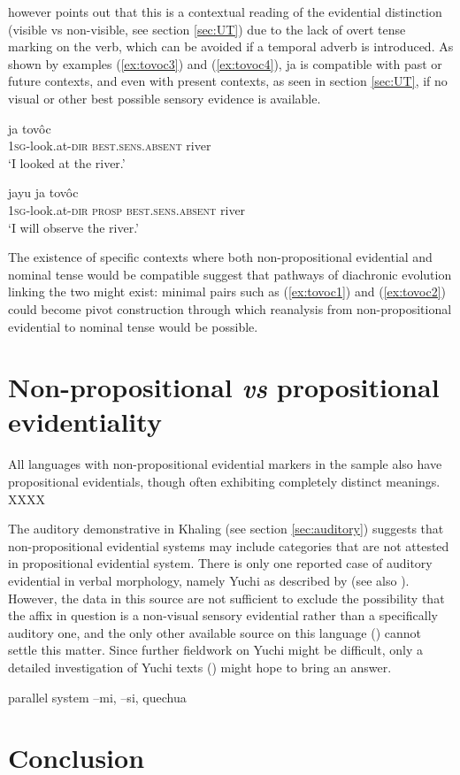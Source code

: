 \documentclass[oneside,a4paper,11pt]{article}
\newcommand{\ipa}[1]{{\phon \mbox{#1}}} %
\begin{document}
\citet{gutierrez14determiners} however points out that this is a contextual reading of the evidential distinction (visible vs non-visible, see section \ref{sec:UT}) due to the lack of overt tense marking on the verb, which can be avoided if a temporal adverb is introduced. As shown by examples (\ref{ex:tovoc3}) and (\ref{ex:tovoc4}), \ipa{ja} is compatible with past or future contexts, and even with present contexts, as seen in section \ref{sec:UT}, if no visual or other best possible sensory evidence is available.


\begin{exe}
\ex \label{ex:tovoc3}
\gll \ipa{j-ovalh-ei} \ipa{ja} \ipa{tovôc} \\
 \textsc{1sg}-look.at-\textsc{dir} \textsc{best.sens.absent} river \\
\glt `I looked at the river.'
\end{exe}

\begin{exe}
\ex \label{ex:tovoc4}
\gll \ipa{j-ovalh-ei}  \ipa{jayu}   \ipa{ja} \ipa{tovôc} \\
 \textsc{1sg}-look.at-\textsc{dir} \textsc{prosp} \textsc{best.sens.absent} river \\
\glt `I will observe the river.'
\end{exe}

The existence of specific contexts where both non-propositional evidential and nominal tense would be compatible suggest that  pathways of diachronic evolution linking the two might exist: minimal pairs such as (\ref{ex:tovoc1}) and (\ref{ex:tovoc2}) could become pivot construction through which reanalysis from non-propositional evidential to nominal tense would be possible.

\section{Non-propositional \textit{vs} propositional evidentiality}
 All languages with non-propositional evidential markers in the sample also have propositional evidentials, though often exhibiting completely distinct meanings. XXXX


The auditory demonstrative in Khaling (see section \ref{sec:auditory}) suggests that non-propositional evidential systems may include categories that are not attested in propositional evidential system. There is only one reported case of auditory evidential in verbal morphology, namely  Yuchi as described by \citet{linn01euchee} (see also \citealt[37]{aikhenvald06}). However, the data in this source are not sufficient to exclude the possibility that the affix in question is a non-visual sensory evidential rather than a specifically auditory one, and the only other available source on this language (\citealt{wagner38yuchi}) cannot settle this matter. Since further fieldwork on Yuchi might be difficult, only a detailed investigation of Yuchi texts (\citealt{wagner31tales}) might hope to bring an answer.

parallel system \ipa{--mi},  \ipa{--si}, quechua

\section{Conclusion}




\end{document}
